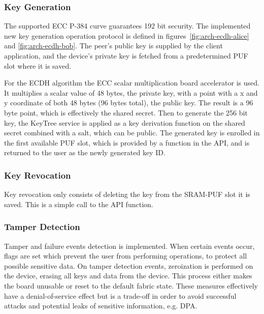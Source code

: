 \subsubsection*{Key Generation}
The supported \ac{ECC} P-384 curve guarantees 192 bit security.
The implemented new key generation operation protocol is defined in figures~\ref{fig:arch-ecdh-alice} and \ref{fig:arch-ecdh-bob}.
The peer's public key is supplied by the client application, and the device's private key is fetched from a predetermined PUF slot where it is saved.

For the ECDH algorithm the ECC scalar multiplication board accelerator is used. It multiplies a scalar value of 48 bytes, the private key, with a point with a x and y coordinate of both 48 bytes (96 bytes total), the public key.
The result is a 96 byte point, which is effectively the shared secret.
Then to generate the 256 bit key, the KeyTree service is applied as a key derivation function on the shared secret combined with a salt, which can be public.
The generated key is enrolled in the first available PUF slot, which is provided by a function in the API, and is returned to the user as the newly generated key ID.

\subsubsection*{Key Revocation}
Key revocation only consists of deleting the key from the SRAM-PUF slot it is saved. This is a simple call to the API function.

\subsubsection*{Tamper Detection}

Tamper and failure events detection is implemented. When certain events occur, flags are set which prevent the user from performing operations, to protect all possible sensitive data.
On tamper detection events, zeroization is performed on the device, erasing all keys and data from the device. This process either makes the board unusable or reset to the default fabric state.
These measures effectively have a denial-of-service effect but is a trade-off in order to avoid successful attacks and potential leaks of sensitive information, e.g. \ac{DPA}.

